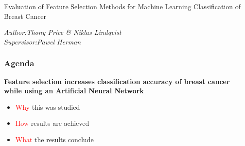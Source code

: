 \documentclass[aspectratio=1610]{beamer}
\begin{document}
\begin{frame}

  \vspace{0.02\textheight}

  \begin{Large}
    Evaluation of Feature Selection Methods for Machine Learning Classification of Breast Cancer
  \end{Large}

  \vspace{0.1\textheight}

  \begin{small}
    \textit{
      Author:\qquad Thony Price \& Niklas Lindqvist\\
      Supervisor:\quad Pawel Herman
    }
  \end{small}
\end{frame}




\begin{frame}
  \frametitle{\hfill Agenda}
  \textbf{Feature selection increases classification accuracy of breast cancer while using an Artificial Neural Network
  }
  \pause

  \begin{itemize}
    \item \textcolor{red}{Why} this was studied\pause
    \item \textcolor{red}{How} results are achieved\pause
    \item \textcolor{red}{What} the results conclude
  \end{itemize}
\end{frame}

\end{document}
